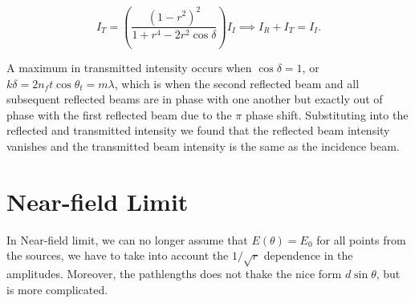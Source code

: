 \documentclass[english,a4paper,12pt]{report}
\begin{document}
{\begin{equation}
    I_{T} = \left( \frac{(1-r^2)^2}{1+r^4-2r^2\cos \delta }  \right)I_{I}  \implies I_{R} + I_{T} = I_{I}.   
\end{equation}

A maximum in transmitted intensity occurs when \(\cos \delta = 1\), or \(k\delta = 2n_{f}t \cos \theta _{t} = m\lambda   \), which is when the second reflected beam and all subsequent reflected beams are in phase with one another but exactly out of phase with the first reflected beam due to the \(\pi \) phase shift. Substituting into the reflected and transmitted intensity we found that the reflected beam intensity vanishes and the transmitted beam intensity is the same as the incidence beam. 
} 




\section{Near-field Limit}

In Near-field limit, we can no longer assume that \(E(\theta ) = E_0 \) for all points from the sources, we have to take into account the \(1 /\sqrt{r}  \) dependence in the amplitudes. Moreover, the pathlengths does not thake the nice form \(d\sin \theta \), but is more complicated.   
\end{document}
